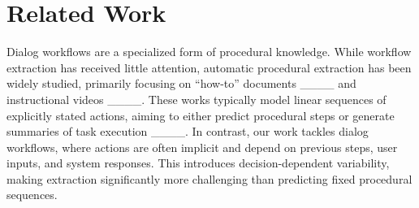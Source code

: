 \section{Related Work}



Dialog workflows are a specialized form of procedural knowledge. While workflow extraction has received little attention, automatic procedural extraction has been widely studied, primarily focusing on ``how-to'' documents ____ and instructional videos ____.
These works typically model linear sequences of explicitly stated actions, aiming to either predict procedural steps or generate summaries of task execution ____.
In contrast, our work tackles dialog workflows, where actions are often implicit and depend on previous steps, user inputs, and system responses. This introduces decision-dependent variability, making extraction significantly more challenging than predicting fixed procedural sequences.


